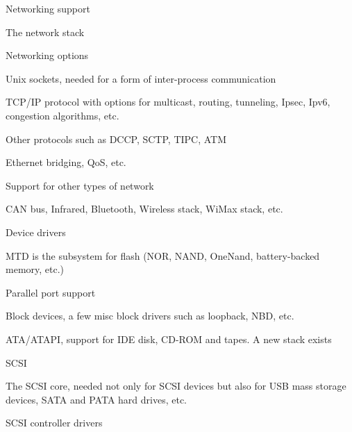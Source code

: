   \startitemize
  \item Networking support
    \startitemize
    \item The network stack
    \item Networking options
      \startitemize
      \item Unix sockets, needed for a form of inter-process
        communication
      \item TCP/IP protocol with options for multicast, routing,
        tunneling, Ipsec, Ipv6, congestion algorithms, etc.
      \item Other protocols such as DCCP, SCTP, TIPC, ATM
      \item Ethernet bridging, QoS, etc.
      \stopitemize
    \item Support for other types of network
      \startitemize
      \item CAN bus, Infrared, Bluetooth, Wireless stack, WiMax stack,
        etc.
      \stopitemize
    \stopitemize
  \stopitemize

  \startitemize
  \item Device drivers
    \startitemize
    \item MTD is the subsystem for flash (NOR, NAND, OneNand,
      battery-backed memory, etc.)
    \item Parallel port support
    \item Block devices, a few misc block drivers such as loopback,
      NBD, etc.
    \item ATA/ATAPI, support for IDE disk, CD-ROM and tapes. A new
      stack exists
    \item SCSI
      \startitemize
      \item The SCSI core, needed not only for SCSI devices but also
        for USB mass storage devices, SATA and PATA hard drives, etc.
      \item SCSI controller drivers
      \stopitemize
    \stopitemize
  \stopitemize

